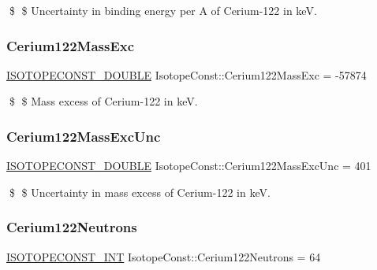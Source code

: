 \$ \$ Uncertainty in binding energy per A of Cerium-\/122 in keV. \mbox{\label{group___isotope_const-_cerium-_ce122_ga9af8162702faff50f4bc284b889e931e}} 
\subsubsection{\texorpdfstring{Cerium122\+Mass\+Exc}{Cerium122MassExc}}
{\footnotesize\ttfamily \mbox{\hyperlink{group___isotope_const-_macros_ga8f45a7272ce02c0b4c65c44636ed719a}{I\+S\+O\+T\+O\+P\+E\+C\+O\+N\+S\+T\+\_\+\+D\+O\+U\+B\+LE}} Isotope\+Const\+::\+Cerium122\+Mass\+Exc = -\/57874}

\$ \$ Mass excess of Cerium-\/122 in keV. \mbox{\label{group___isotope_const-_cerium-_ce122_ga486cb7298ef922b2216d18b8e398ac3e}} 
\subsubsection{\texorpdfstring{Cerium122\+Mass\+Exc\+Unc}{Cerium122MassExcUnc}}
{\footnotesize\ttfamily \mbox{\hyperlink{group___isotope_const-_macros_ga8f45a7272ce02c0b4c65c44636ed719a}{I\+S\+O\+T\+O\+P\+E\+C\+O\+N\+S\+T\+\_\+\+D\+O\+U\+B\+LE}} Isotope\+Const\+::\+Cerium122\+Mass\+Exc\+Unc = 401}

\$ \$ Uncertainty in mass excess of Cerium-\/122 in keV. \mbox{\label{group___isotope_const-_cerium-_ce122_ga9c3d0d122211e4fd5ed0d0afb7c6fa10}} 
\subsubsection{\texorpdfstring{Cerium122\+Neutrons}{Cerium122Neutrons}}
{\footnotesize\ttfamily \mbox{\hyperlink{group___isotope_const-_macros_ga5f18360b3e99483a35c32d789e62621c}{I\+S\+O\+T\+O\+P\+E\+C\+O\+N\+S\+T\+\_\+\+I\+NT}} Isotope\+Const\+::\+Cerium122\+Neutrons = 64}

